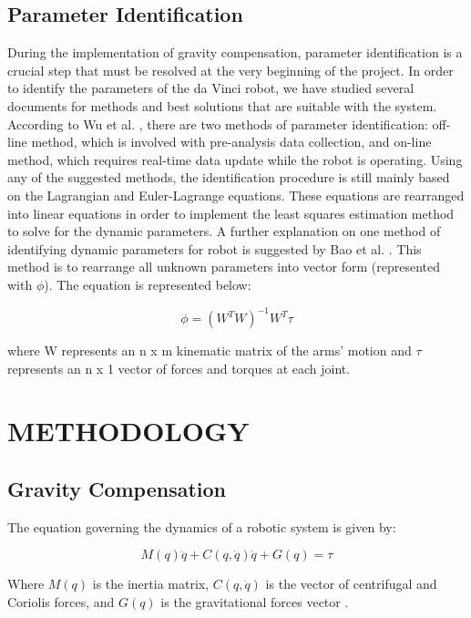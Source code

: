 \documentclass[conference]{IEEEtran}
\begin{document}
\subsection{Parameter Identification}
During the implementation of gravity compensation, parameter identification is a crucial step that must be resolved at the very beginning of the project.         	  
In order to identify the parameters of the da Vinci robot, we have studied several documents for methods and best solutions that are suitable with the system. According to Wu et al. \cite{3}, there are two methods of parameter identification: off-line method, which is involved with pre-analysis data collection, and on-line method, which requires real-time data update while the robot is operating. Using any of the suggested methods, the identification procedure is still mainly based on the Lagrangian and Euler-Lagrange equations. These equations are rearranged into linear equations in order to implement the least squares estimation method to solve for the dynamic parameters.
A further explanation on one method of identifying dynamic parameters for robot is suggested by Bao et al. \cite{4}. This method is to rearrange all unknown parameters into vector form (represented with $\phi$). The equation is represented below:

\begin{equation}
\label{regression_matrix_equation}
\phi = (W^{T}W)^{-1}W^T\tau
\end{equation}

where W represents an n x m kinematic matrix of the arms\textsc{'} motion and $\tau$ represents an n x 1 vector of forces and torques at each joint.


\section{METHODOLOGY}

\subsection{Gravity Compensation}
The equation governing the dynamics of a robotic system is given by:

\begin{equation}
\label{robot_dynamic_equation}
M(q)\ddot{q} + C(q,\dot{q})\dot{q} + G(q) = \tau
\end{equation}

Where $M(q)$ is the inertia matrix, 
$C(q,\dot{q})$ is the vector of centrifugal and Coriolis forces, and $G(q)$ is the gravitational forces vector \cite{4}.
\end{document}
